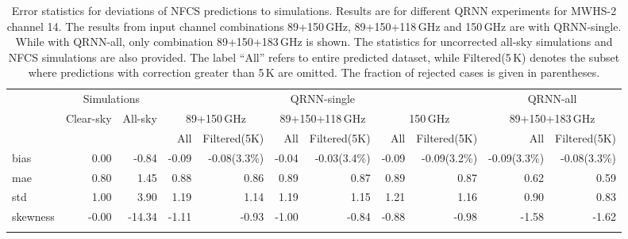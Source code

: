 \documentclass[amt, manuscript]{copernicus}
\begin{document}
\begin{table}[t]
	\caption{Error statistics for deviations of NFCS predictions to simulations. Results are for different QRNN experiments for MWHS-2 channel 14. The results from input channel combinations 89+150\,GHz, 89+150+118\,GHz and 150\,GHz are with QRNN-single. While with QRNN-all, only combination 89+150+183\,GHz is shown. The statistics for uncorrected all-sky simulations and NFCS simulations are also provided. The label ``All'' refers to entire predicted dataset, while Filtered(5\,K) denotes the subset where predictions with correction greater than 5\,K are omitted. The fraction of rejected cases is given in parentheses. }
	\label{tab:error_statistics_mwhs_14}
	\begin{tabular}{lrr|rr|rr|rr|rr}
		\tophline
		&\multicolumn{2}{c|}{Simulations}& \multicolumn{6}{c|}{QRNN-single} & \multicolumn{2}{c}{QRNN-all}\\
		\cline{2-11}
		&   Clear-sky &   All-sky &  \multicolumn{2}{c|}{89+150\,GHz} & \multicolumn{2}{c|}{89+150+118\,GHz} & \multicolumn{2}{c|}{150\,GHz} & \multicolumn{2}{c}{89+150+183\,GHz}\\
		&			   &			& All & Filtered(5K) & All & Filtered(5K) & All & Filtered(5K)  & All & Filtered(5K)\\
		\middlehline
		bias     &  0.00 &  -0.84 & -0.09 & -0.08(3.3\%) & -0.04 & -0.03(3.4\%) & -0.09 & -0.09(3.2\%) & -0.09(3.3\%) & -0.08(3.3\%)  \\
		mae      &  0.80 &   1.45 &  0.88 &  0.86 &  0.89 &  0.87 &  0.89 &  0.87 &  0.62 &  0.59\\
		std      &  1.00 &   3.90 &  1.19 &  1.14 &  1.19 &  1.15 &  1.21 &  1.16 &  0.90 &  0.83\\
		skewness & -0.00 & -14.34 & -1.11 & -0.93 & -1.00 & -0.84 & -0.88 & -0.98 & -1.58 & -1.62\\
		\bottomhline
	\end{tabular}
\end{table}
\end{document}
